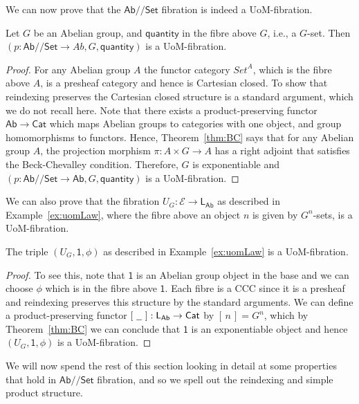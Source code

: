 \documentclass[a4paper,UKenglish]{lipics}
\newcommand{\msf}[1]{\mathsf{#1}} %
\newcommand{\Ab}{\msf{Ab}}
\newcommand{\Set}{\msf{Set}}
\newcommand{\Cat}{\msf{Cat}}
\newcommand{\LAb}{\msf{L}_{\msf{Ab}}}
\newcommand{\terminal}{\msf{1}}
\newcommand{\E}{\mathcal{E}}
\newcommand{\blank}{\, \underline{\hspace{2mm}} \,}
\newcommand{\SqFun}[1][\blank]{[\, #1 \, ]} %
\newcommand{\GroupSet}[1]{#1/\!/\Set}
\newcommand{\AbSet}{\GroupSet{\Ab}}
\newcommand{\num}{\msf{quantity}}
\newcommand{\UoMFibration}{UoM-fibration\xspace}
\begin{document}
We can now prove that the $\AbSet$ fibration is indeed a UoM-fibration.

\begin{theorem}
\label{thm:gsets}
  Let $G$ be an Abelian group, and $\num$ in the fibre above $G$, i.e., a $G$-set. Then $(p:\AbSet \rightarrow Ab, G, \num)$ is a UoM-fibration.
\end{theorem}

\begin{proof}
For any Abelian group $A$ the functor category ${Set}^A$, which is the fibre above $A$, is a presheaf category and hence is Cartesian closed. To show that reindexing preserves the Cartesian closed structure is a standard argument, which we do not recall here. Note that there exists a product-preserving functor $\Ab \rightarrow \Cat$ which maps Abelian groups to categories with one object, and group homomorphisms to functors. Hence, Theorem~\ref{thm:BC} says that for any Abelian group $A$, the projection morphism $\pi : A \times G \rightarrow A$ has a right adjoint  that satisfies the Beck-Chevalley condition. Therefore, $G$ is exponentiable and $(p:\AbSet \rightarrow \Ab, G, \num)$ is a UoM-fibration.
\end{proof}

We can also prove that the fibration $U_G:\E \rightarrow \LAb$ as described in Example~\ref{ex:uomLaw}, where the fibre above an object $n$ is given by $G^n$-sets, is a UoM-fibration.

\begin{theorem}
The triple $(U_G, \terminal, \phi)$ as described in Example~\ref{ex:uomLaw} is a \UoMFibration.
\end{theorem}

\begin{proof}
 To see this, note that $\terminal$ is an Abelian group object in the base and we can choose $\phi$ which is in the fibre above $\terminal$. Each fibre is a CCC since it is a presheaf and reindexing preserves this structure by the standard arguments. We can define a product-preserving functor $\SqFun :\LAb \rightarrow \Cat$ by $\SqFun[n]=G^n$, which by Theorem~\ref{thm:BC} we can conclude that $\terminal$ is an exponentiable object and hence $(U_G, \terminal, \phi)$ is a UoM-fibration.
\end{proof}



We will now spend the rest of this section looking in detail at some properties that hold in $\AbSet$ fibration, and so we spell out the reindexing and simple product structure.
\end{document}
